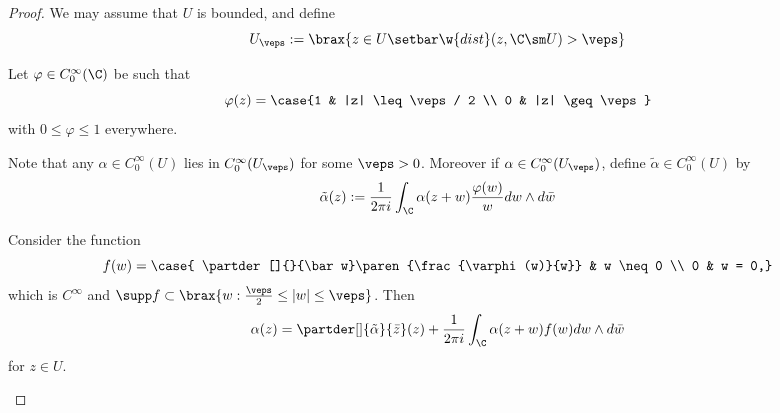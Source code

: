 \documentclass[11pt]{report}
\begin{document}
\begin{proof}
We may assume that $U$ is bounded, and define
\[
U_\veps := \brax{z \in U \setbar \w{dist}(z,\C\sm U)> \veps}
\]
\begin{figure}[H]
	\centering
	\label{fig:u-epsilon}
\end{figure}
Let $\varphi \in C_0^\infty (\C)$ be such that
\[
\varphi(z)= \case{1 & |z| \leq \veps / 2 \\ 0 & |z| \geq \veps}
\]
with $0 \leq \varphi \leq 1$ everywhere.

Note that any $\alpha \in C_0^\infty (U)$ lies in $C_0^\infty (U_\veps)$ for some $\veps >0$.  Moreover if $\alpha \in C_0^\infty (U_\veps)$, define $\tilde \alpha \in C_0^\infty (U)$ by
\[
\tilde \alpha(z) := \frac{1}{2\pi i }\int_\C \alpha (z+w)\frac{\varphi(w)}w{dw \land d\bar w}
\]
\begin{claim} \label{clm:alpha-is-integral}
Consider the function \[
f(w)= \case{ \partder[]{}{\bar w}\paren{\frac{\varphi(w)}{w}} & w \neq 0  \\ 0 & w = 0,}
\]
which is $C^\infty$ and $\supp f \subset \brax{w : \frac{\veps}{2}\leq |w| \leq \veps}$. Then
\begin{equation} \label{eq:alpha-is-integral}
    \alpha(z)
 = \partder[]{\tilde \alpha}{\bar z}(z) + \frac{1}{2\pi i }\int_\C \alpha(z+w)f(w)dw \land d \bar w
\end{equation}
for $z \in U$.
\end{claim}


\end{proof}
\end{document}
